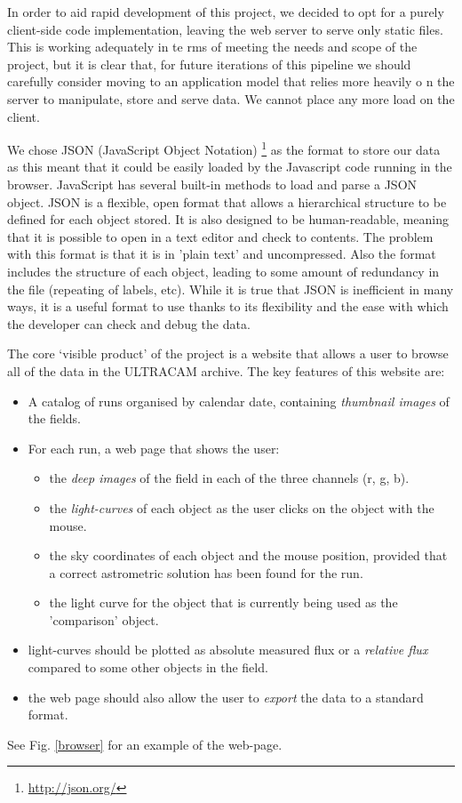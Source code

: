 In order to aid rapid development of this project, we decided to opt for a purely client-side code implementation, leaving the web server to serve only static files. This is working adequately in te
rms of meeting the needs and scope of the project, but it is clear that, for future iterations of this pipeline we should carefully consider moving to an application model that relies more heavily o
n the server to manipulate, store and serve data. We cannot place any more load on the client. 

We chose JSON (JavaScript Object Notation) \footnote{\url{http://json.org/}} as the format to store our data as this meant that it could be easily loaded by the Javascript code running in the browser. JavaScript has several built-in methods to load and parse a JSON object. JSON is a flexible, open format that allows a hierarchical structure to be defined for each object stored. It is also designed to be human-readable, meaning that it is possible to open in a text editor and check to contents. The problem with this format is that it is in 'plain text' and uncompressed. Also the format includes the structure of each object, leading to some amount of redundancy in the file (repeating of labels, etc). While it is true that JSON is inefficient in many ways, it is a useful format to use thanks to its flexibility and the ease with which the developer can check and debug the data. 

The core `visible product' of the project is a website that allows a user to browse all of the data in the ULTRACAM archive. The key features of this website are:

\begin{itemize}
	\item A catalog of runs organised by calendar date, containing \emph{thumbnail images} of the fields.
	\item For each run, a web page that shows the user:
	\begin{itemize}
		\item the \emph{deep images} of the field in each of the three channels (r, g, b).
		\item the \emph{light-curves} of each object as the user clicks on the object with the mouse. 
		\item the sky coordinates of each object and the mouse position, provided that a correct astrometric solution has been found for the run. 
		\item the light curve for the object that is currently being used as the 'comparison' object. 
	\end{itemize}
	\item light-curves should be plotted as absolute measured flux or a \emph{relative flux} compared to some other objects in the field. 
	\item the web page should also allow the user to \emph{export} the data to a standard format.
	
\end{itemize}
See Fig. \ref{browser} for an example of the web-page. 

